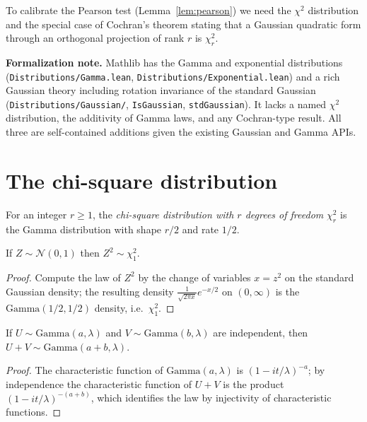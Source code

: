 To calibrate the Pearson test (Lemma~\ref{lem:pearson}) we need the $\chi^2$
distribution and the special case of Cochran's theorem stating that a Gaussian
quadratic form through an orthogonal projection of rank $r$ is $\chi^2_r$.

\textbf{Formalization note.} Mathlib has the Gamma and exponential distributions
(\texttt{Distributions/Gamma.lean}, \texttt{Distributions/Exponential.lean}) and
a rich Gaussian theory including rotation invariance of the standard Gaussian
(\texttt{Distributions/Gaussian/}, \texttt{IsGaussian}, \texttt{stdGaussian}). It
lacks a named $\chi^2$ distribution, the additivity of Gamma laws, and any
Cochran-type result. All three are self-contained additions given the existing
Gaussian and Gamma APIs.

\section{The chi-square distribution}
\label{sec:pre_chisq_def}

\begin{definition}\label{def:chiSquared}
For an integer $r\ge1$, the \emph{chi-square distribution with $r$ degrees of
freedom} $\chi^2_r$ is the Gamma distribution with shape $r/2$ and rate $1/2$.
\end{definition}

\begin{lemma}\label{lem:sq_gaussian_chisq1}
If $Z\sim\mathcal{N}(0,1)$ then $Z^2\sim\chi^2_1$.
\end{lemma}

\begin{proof}
Compute the law of $Z^2$ by the change of variables $x = z^2$ on the standard
Gaussian density; the resulting density $\frac{1}{\sqrt{2\pi x}}e^{-x/2}$ on
$(0,\infty)$ is the $\mathrm{Gamma}(1/2,1/2)$ density, i.e.\ $\chi^2_1$.
\end{proof}

\begin{lemma}\label{lem:gamma_add}
If $U\sim\mathrm{Gamma}(a,\lambda)$ and $V\sim\mathrm{Gamma}(b,\lambda)$ are
independent, then $U+V\sim\mathrm{Gamma}(a+b,\lambda)$.
\end{lemma}

\begin{proof}
The characteristic function of $\mathrm{Gamma}(a,\lambda)$ is
$(1 - it/\lambda)^{-a}$; by independence the characteristic function of $U+V$ is
the product $(1-it/\lambda)^{-(a+b)}$, which identifies the law by injectivity of
characteristic functions.
\end{proof}

